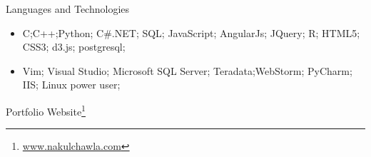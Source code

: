 \documentclass[]{nakulcv}
\begin{document}
	\begin{cvsection}{Languages and Technologies}
		\begin{cvsubsection}{}{}{}	
			\begin{itemize}
				\item C;C++;Python; C\#.NET; SQL; JavaScript; AngularJs; JQuery; R; HTML5; CSS3; d3.js; postgresql;
				\item Vim; Visual Studio; Microsoft SQL Server; Teradata;WebStorm; PyCharm; IIS; Linux power user;
			\end{itemize}
		\end{cvsubsection}
	\end{cvsection}
Portfolio Website\footnote{\url{www.nakulchawla.com}}
\end{document}
